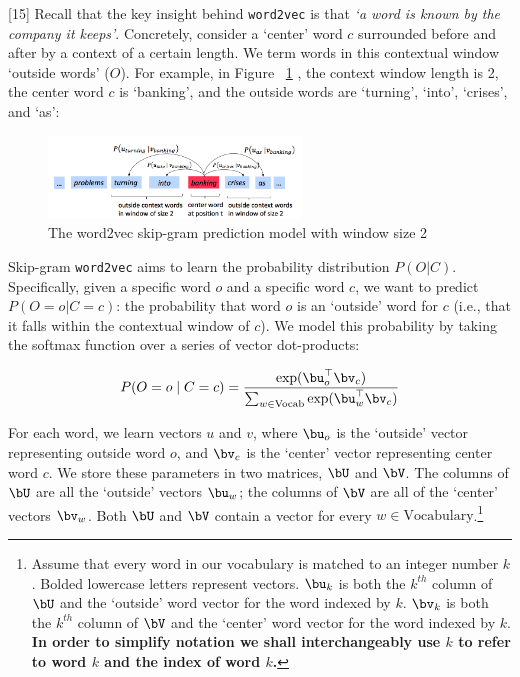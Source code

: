 [15]
Recall that the key insight behind {\tt word2vec} is that \textit{`a word is known by the company it keeps'}. Concretely, consider a `center' word $c$ surrounded before and after by a context of a certain length. We term words in this contextual window `outside words' ($O$). For example, in Figure~ \ref{fig:word2vec} , the context window length is 2, the center word $c$ is `banking', and the outside words are `turning', `into', `crises', and `as':

\begin{figure}[h]
    \centering
    \includegraphics[width=0.6\textwidth]{word2vec.png}
    \caption{The word2vec skip-gram prediction model with window size 2}
    \label{fig:word2vec}
\end{figure}

Skip-gram {\tt word2vec} aims to learn the probability distribution $P(O|C)$. 
Specifically, given a specific word $o$ and a specific word $c$, we want to predict $P(O=o|C=c)$: the probability that word $o$ is an `outside' word for $c$ (i.e., that it falls within the contextual window of $c$).
We model this probability by taking the softmax function over a series of vector dot-products: %

\begin{equation}
 P(O=o \mid C=c) = \frac{\exp(\bu_{o}^\top \bv_c)}{\sum_{w \in \text{Vocab}} \exp(\bu_{w}^\top \bv_c)}
 \label{word2vec_condprob}
\end{equation}

For each word, we learn vectors $u$ and $v$, where $\bu_o$ is the `outside' vector representing outside word $o$, and $\bv_c$ is the `center' vector representing center word $c$. 
We store these parameters in two matrices, $\bU$ and $\bV$.
The columns of $\bU$ are all the `outside' vectors $\bu_{w}$;
the columns of $\bV$ are all of the `center' vectors $\bv_{w}$. 
Both $\bU$ and $\bV$ contain a vector for every $w \in \text{Vocabulary}$.\footnote{Assume that every word in our vocabulary is matched to an integer number $k$. Bolded lowercase letters represent vectors. $\bu_{k}$ is both the $k^{th}$ column of $\bU$ and the `outside' word vector for the word indexed by $k$. $\bv_k$ is both the $k^{th}$ column of $\bV$ and the `center' word vector for the word indexed by $k$. \textbf{In order to simplify notation we shall interchangeably use $k$ to refer to word $k$ and the index of word $k$.}}\newline

